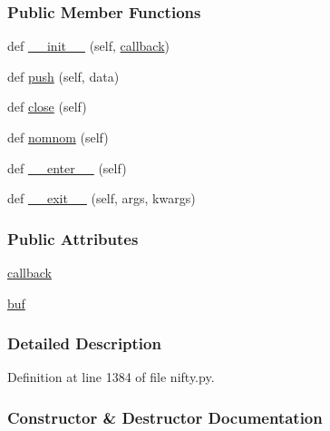 \subsubsection*{Public Member Functions}
\begin{DoxyCompactItemize}
\item 
def \hyperlink{classsrc_1_1nifty_1_1LineChunker_a0594e14f6aab910fb41f72a41914c5d5}{\+\_\+\+\_\+init\+\_\+\+\_\+} (self, \hyperlink{classsrc_1_1nifty_1_1LineChunker_a6700f1ac30f31d8396b102c9565a0984}{callback})
\item 
def \hyperlink{classsrc_1_1nifty_1_1LineChunker_ad40b3d34790aa79d65c2e6984d936f16}{push} (self, data)
\item 
def \hyperlink{classsrc_1_1nifty_1_1LineChunker_a1b6f395ea4d5a099b7d99ba9dd1cc63d}{close} (self)
\item 
def \hyperlink{classsrc_1_1nifty_1_1LineChunker_a01c0b5c62f685e52b3d18bf3638df155}{nomnom} (self)
\item 
def \hyperlink{classsrc_1_1nifty_1_1LineChunker_a4f69d674b7b5db51a531fef4b70dde66}{\+\_\+\+\_\+enter\+\_\+\+\_\+} (self)
\item 
def \hyperlink{classsrc_1_1nifty_1_1LineChunker_afb2404f043fe01c296966415c29af251}{\+\_\+\+\_\+exit\+\_\+\+\_\+} (self, args, kwargs)
\end{DoxyCompactItemize}
\subsubsection*{Public Attributes}
\begin{DoxyCompactItemize}
\item 
\hyperlink{classsrc_1_1nifty_1_1LineChunker_a6700f1ac30f31d8396b102c9565a0984}{callback}
\item 
\hyperlink{classsrc_1_1nifty_1_1LineChunker_ac19d331e76548f84d0c6ed49086109ac}{buf}
\end{DoxyCompactItemize}


\subsubsection{Detailed Description}


Definition at line 1384 of file nifty.\+py.



\subsubsection{Constructor \& Destructor Documentation}
\mbox{\label{classsrc_1_1nifty_1_1LineChunker_a0594e14f6aab910fb41f72a41914c5d5}} 
